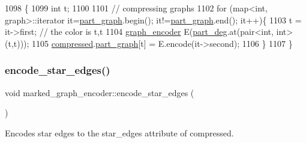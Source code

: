 \begin{DoxyCode}
1098 \{
1099   \textcolor{keywordtype}{int} t;
1100 
1101   \textcolor{comment}{// compressing graphs}
1102   \textcolor{keywordflow}{for} (map<int, graph>::iterator it=\hyperlink{classmarked__graph__encoder_adbafd0769ae301acc1b2c19b5e1d4844}{part\_graph}.begin(); it!=\hyperlink{classmarked__graph__encoder_adbafd0769ae301acc1b2c19b5e1d4844}{part\_graph}.end(); it++)\{
1103     t = it->first; \textcolor{comment}{// the color is t,t}
1104     \hyperlink{classgraph__encoder}{graph\_encoder} E(\hyperlink{classmarked__graph__encoder_a55ea2edb2609dfc287432f61900d6ad1}{part\_deg}.at(pair<int, int>(t,t)));
1105     \hyperlink{classmarked__graph__encoder_ac2ded200860fdd2321f86dd76b28bcb3}{compressed}.\hyperlink{classmarked__graph__compressed_ae179a4737e6eab905c18a94d44ef64b7}{part\_graph}[t] = E.encode(it->second);
1106   \}
1107 \}
\end{DoxyCode}
\mbox{\label{classmarked__graph__encoder_ad6883669a47d24e3d9898978f3252727}} 
\subsubsection{\texorpdfstring{encode\+\_\+star\+\_\+edges()}{encode\_star\_edges()}}
{\footnotesize\ttfamily void marked\+\_\+graph\+\_\+encoder\+::encode\+\_\+star\+\_\+edges (\begin{DoxyParamCaption}{ }\end{DoxyParamCaption})\hspace{0.3cm}{\ttfamily [private]}}



Encodes star edges to the star\+\_\+edges attribute of compressed. 


